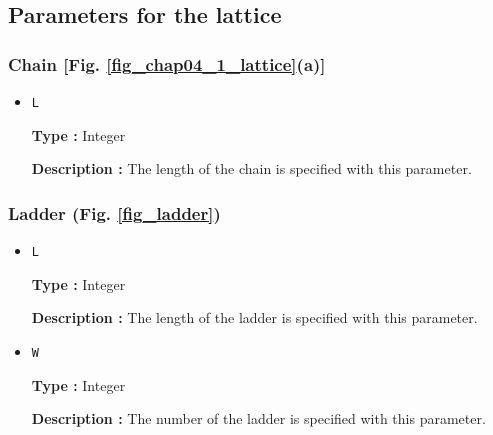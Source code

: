 \begin{itemize}
\end{itemize}

\subsection{Parameters for the lattice}

\subsubsection{Chain [Fig. \ref{fig_chap04_1_lattice}(a)]}

\begin{itemize}

\item \verb|L|

{\bf Type :} Integer

{\bf Description :} The length of the chain is specified 
with this parameter.

\end{itemize}

\subsubsection{Ladder (Fig. \ref{fig_ladder})}

\begin{itemize}

\item \verb|L|

{\bf Type :} Integer

{\bf Description :} The length of the ladder is specified 
with this parameter.

\item \verb|W|

{\bf Type :} Integer

{\bf Description :} The number of the ladder is specified 
with this parameter.

\end{itemize}

